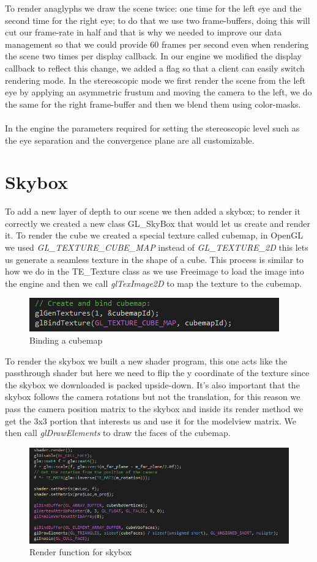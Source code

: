 \documentclass[a4paper]{report}
\begin{document}
To render anaglyphs we draw the scene twice: one time for the left eye and the second time for the right eye; to do that we use two frame-buffers, doing this will cut our frame-rate in half and that is why we needed to improve our data management so that we could provide 60 frames per second even when rendering the scene two times per display callback. In our engine we modified the display callback to reflect this change, we added a flag so that a client can easily switch rendering mode. In the stereoscopic mode we first render the scene from the left eye by applying an asymmetric frustum and moving the camera to the left, we do the same for the right frame-buffer and then we blend them using color-masks.\\
\\
In the engine the parameters required for setting the stereoscopic level such as the eye separation and the convergence plane are all customizable.
\chapter{Skybox}
To add a new layer of depth to our scene we then added a skybox; to render it correctly we created a new class GL\_SkyBox that would let us create and render it. To render the cube we created a special texture called cubemap, in OpenGL we used \emph{GL\_TEXTURE\_CUBE\_MAP}  instead of \emph{GL\_TEXTURE\_2D} this lets us generate a seamless texture in the shape of a cube. This process is similar to how we do in the TE\_Texture class as we use Freeimage to load the image into the engine and then we call \emph{glTexImage2D} to map the texture to the cubemap. \\
\begin{figure}[H]
\centering
\includegraphics[scale=1]{cubemap}
\caption{Binding a cubemap}
\end{figure}
To render the skybox we built a new shader program, this one acts like the passthrough shader but here we need to flip the y coordinate of the texture since the skybox we downloaded is packed upside-down. It's also important that the skybox follows the camera rotations but not the translation, for this reason we pass the camera position matrix to the skybox and inside its render method we get the 3x3 portion that interests us and use it for the modelview matrix. We then call \emph{glDrawElements} to draw the faces of the cubemap.
\begin{figure}[H]
\centering
\includegraphics[scale=0.5]{skyboxRender}
\caption{Render function for skybox}
\end{figure}
\end{document}
